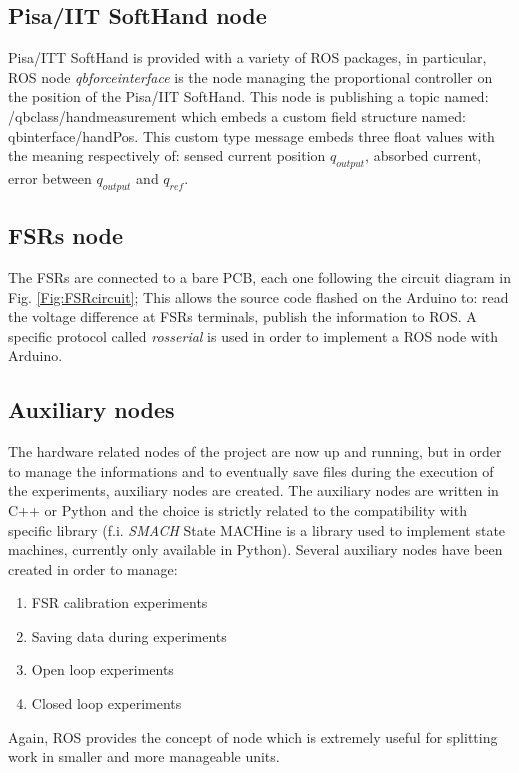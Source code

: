 \subsection{Pisa/IIT SoftHand node}
Pisa/ITT SoftHand is provided with a variety of ROS packages, in particular, ROS node \textit{qb\textunderscore force\textunderscore interface} is the node managing the proportional controller on the position of the Pisa/IIT SoftHand. This node is publishing a topic named: /qb\textunderscore class/hand\textunderscore measurement which embeds a custom field structure named: qb\textunderscore interface/handPos. This custom type message embeds three float values with the meaning respectively of: sensed current position $q_{output}$, absorbed current, error between $q_{output}$ and $q_{ref}$.

\subsection{FSRs node}
The FSRs are connected to a bare PCB, each one following the circuit diagram in Fig. \ref{Fig:FSRcircuit}; This allows the source code flashed on the Arduino to: read the voltage difference at FSRs terminals, publish the information to ROS.
A specific protocol called \textit{rosserial} is used in order to implement a ROS node with Arduino.

\subsection{Auxiliary nodes}
The hardware related nodes of the project are now up and running, but in order to manage the informations and to eventually save files during the execution of the experiments, auxiliary nodes are created.
The auxiliary nodes are written in C++ or Python and the choice is strictly related to the compatibility with specific library (f.i. \textit{SMACH} State MACHine is a library used to implement state machines, currently only available in Python).
Several auxiliary nodes have been created in order to manage:

\begin{enumerate}
\item FSR calibration experiments
\item Saving data during experiments
\item Open loop experiments
\item Closed loop experiments
\end{enumerate}
Again, ROS provides the concept of node which is extremely useful for splitting work in smaller and more manageable units.
